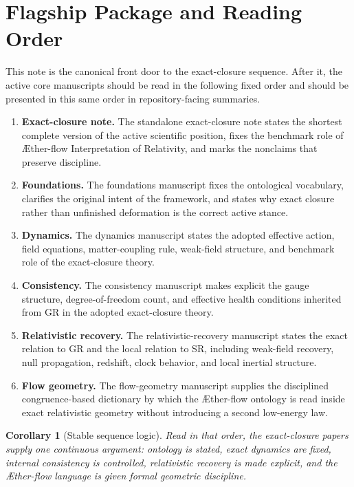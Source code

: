 \documentclass[11pt]{article}
\newcommand{\Aflow}{\AE{}ther-flow}
\newcommand{\TheoryName}{\Aflow{} Interpretation of Relativity}
\newtheorem{corollary}{Corollary}
\begin{document}
\section{Flagship Package and Reading Order}

This note is the canonical front door to the exact-closure sequence. After it, the active core manuscripts should be read in the following fixed order and should be presented in this same order in repository-facing summaries.
\begin{enumerate}
    \item \textbf{Exact-closure note.} The standalone exact-closure note states the shortest complete version of the active scientific position, fixes the benchmark role of \TheoryName{}, and marks the nonclaims that preserve discipline.
    \item \textbf{Foundations.} The foundations manuscript fixes the ontological vocabulary, clarifies the original intent of the framework, and states why exact closure rather than unfinished deformation is the correct active stance.
    \item \textbf{Dynamics.} The dynamics manuscript states the adopted effective action, field equations, matter-coupling rule, weak-field structure, and benchmark role of the exact-closure theory.
    \item \textbf{Consistency.} The consistency manuscript makes explicit the gauge structure, degree-of-freedom count, and effective health conditions inherited from GR in the adopted exact-closure theory.
    \item \textbf{Relativistic recovery.} The relativistic-recovery manuscript states the exact relation to GR and the local relation to SR, including weak-field recovery, null propagation, redshift, clock behavior, and local inertial structure.
    \item \textbf{Flow geometry.} The flow-geometry manuscript supplies the disciplined congruence-based dictionary by which the \Aflow{} ontology is read inside exact relativistic geometry without introducing a second low-energy law.
\end{enumerate}

\begin{corollary}[Stable sequence logic]
Read in that order, the exact-closure papers supply one continuous argument: ontology is stated, exact dynamics are fixed, internal consistency is controlled, relativistic recovery is made explicit, and the \Aflow{} language is given formal geometric discipline.
\end{corollary}
\end{document}
